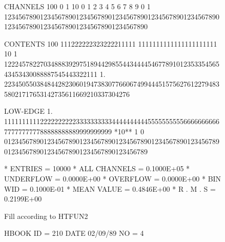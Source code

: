 \begin{figure}[p]
\begin{minipage}[t]{.495\textwidth}
\begin{XMPfrac}{3.3}
CHANNELS 100   0                                                                                                  1
          10   0        1         2         3         4         5         6         7         8         9         0
           1   1234567890123456789012345678901234567890123456789012345678901234567890123456789012345678901234567890
 
CONTENTS 100                       111222222323222211111                  1111111111111111111111
          10             1 12224578227034888392975189442985544344445467789101235335456543453430088887545443322111
           1.       22345055038484428230601947383077660674994445157562761227948358021717653142735611669210337304276
 
LOW-EDGE   1.            111111111122222222223333333333444444444455555555556666666666777777777788888888889999999999
*10**  1   0   0123456789012345678901234567890123456789012345678901234567890123456789012345678901234567890123456789
 
* ENTRIES =      10000      * ALL CHANNELS = 0.1000E+05      * UNDERFLOW = 0.0000E+00      * OVERFLOW = 0.0000E+00
* BIN WID = 0.1000E-01      * MEAN VALUE   = 0.4846E+00      * R . M . S = 0.2199E+00
\end{XMPfrac}   
\end{minipage}\hfill
\begin{minipage}[t]{.495\textwidth}
\begin{XMPfrac}{3.3}
Fill according to HTFUN2
 
HBOOK     ID =       210                                        DATE  02/09/89               NO =  4
 

\end{XMPfrac}
\end{minipage}
\end{figure}
